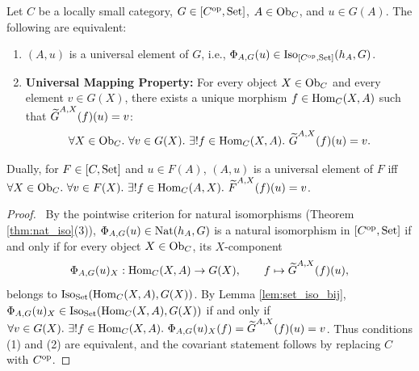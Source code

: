 \documentclass[10pt,a4paper]{article}
\renewcommand{\myprf}{\begin{proof}}
\renewcommand{\myqed}{\end{proof}}
\begin{document}
\begin{theorem}\label{thm:univ_elem_char}
Let $C$ be a locally small category, $G \in [C^{\textrm{op}}, {\textrm{Set}}]$, $A \in {\textrm{Ob}}_C$, and $u \in G(A)$. The following are equivalent:
\begin{enumerate}
\item $(A, u)$ is a universal element of $G$, i.e., $\Phi_{A,G}(u) \in {\mathrm{Iso}}_{[C^{\textrm{op}},{\textrm{Set}}]}(h_A, G)$.
\item \textbf{Universal Mapping Property:} For every object $X \in {\textrm{Ob}}_C$ and every element $v \in G(X)$, there exists a unique morphism $f \in {\textrm{Hom}}_C(X, A)$ such that ${\widetilde{G}\textrm{}}^{A,X}(f)(u) = v$:
$$\forall X \in \Ob_C.\ \forall v \in G(X).\ \exists !f \in \Hom_C(X, A).\ \GMor^{A,X}(f)(u) = v.$$
\end{enumerate}
Dually, for $F \in [C, {\textrm{Set}}]$ and $u \in F(A)$, $(A, u)$ is a universal element of $F$ iff $\forall X \in {\textrm{Ob}}_C.\ \forall v \in F(X).\ \exists !f \in {\textrm{Hom}}_C(A, X).\ {\widetilde{F}\textrm{}}^{A,X}(f)(u) = v$.
\end{theorem}
\myprf\ By the pointwise criterion for natural isomorphisms (Theorem \ref{thm:nat_iso}(3)), $\Phi_{A,G}(u) \in {\textrm{Nat}}(h_A, G)$ is a natural isomorphism in $[C^{\textrm{op}}, {\textrm{Set}}]$ if and only if for every object $X \in {\textrm{Ob}}_C$, its $X$-component
$$\Phi_{A,G}(u)_X : {\textrm{Hom}}_C(X, A) \to G(X), \qquad f \mapsto {\widetilde{G}\textrm{}}^{A,X}(f)(u),$$
 belongs to ${\mathrm{Iso}}_{\textrm{Set}}({\textrm{Hom}}_C(X, A), G(X))$. By Lemma \ref{lem:set_iso_bij}, $\Phi_{A,G}(u)_X \in {\mathrm{Iso}}_{\textrm{Set}}({\textrm{Hom}}_C(X, A), G(X))$ if and only if $\forall v \in G(X).\ \exists !f \in {\textrm{Hom}}_C(X,A).\ \Phi_{A,G}(u)_X(f) = {\widetilde{G}\textrm{}}^{A,X}(f)(u) = v$. Thus conditions (1) and (2) are equivalent, and the covariant statement follows by replacing $C$ with $C^{\textrm{op}}$. \myqed
\end{document}
